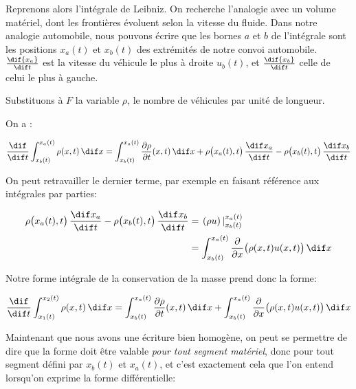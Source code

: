 Reprenons alors l'intégrale de Leibniz.
On recherche l'analogie avec un volume matériel, dont les frontières évoluent selon la vitesse du fluide. Dans notre analogie automobile, nous pouvons écrire que les bornes $a$ et $b$ de l'intégrale sont les positions $x_a(t)$ et $x_b(t)$ des extrémités de notre convoi automobile. 
$\frac{\dif{x_a}}{\dif t}$ est la vitesse du véhicule le plus à droite $u_b(t)$, et 
$\frac{\dif{x_b}}{\dif t}$ celle de celui  le plus à gauche. 

Substituons à $F$ la variable $\rho$, le nombre de véhicules par unité de longueur. 

On a : 

\begin{equation}
\frac{\dif}{\dif t} \int_{x_b(t)}^{x_a(t)} \rho(x,t)\, \dif x
=
\int_{x_b(t)}^{x_a(t)} \frac{\partial \rho}{\partial t}(x,t)\, \dif x
+
\rho\bigl(x_a(t),t\bigr)\,\frac{\dif x_a}{\dif t}
-
\rho\bigl(x_b(t),t\bigr)\,\frac{\dif x_b}{\dif t}
\label{eq:leibniz_rho}
\end{equation}

On peut retravailler le dernier terme, par exemple en faisant référence aux intégrales par parties: 

\begin{equation}
  \begin{split}
\rho\bigl(x_a(t),t\bigr)\,\frac{\dif x_a}{\dif t}
-
\rho\bigl(x_b(t),t\bigr)\,\frac{\dif x_b}{\dif t}
&= 
    \left. (\rho u\right)|_{x_b(t)}^{x_a(t)}\\ &=
    \int_{x_b(t)}^{x_a(t)}\frac{\partial}{\partial x} \bigl(\rho(x,t) u(x,t)\bigr)\,\dif x
\label{eq:leibniz_rho2}
  \end{split}
\end{equation}

Notre forme intégrale de la conservation de la masse prend donc la forme: 

\begin{equation}
\frac{\dif}{\dif t} \int_{x_1(t)}^{x_2(t)} \rho(x,t)\, \dif x
=
\int_{x_b(t)}^{x_a(t)} \frac{\partial \rho}{\partial t}(x,t)\, \dif x
+ \int_{x_b(t)}^{x_a(t)} \frac{\partial}{\partial x} \bigl(\rho(x,t) u(x,t)\bigr)\,\dif x
\label{eq:cons_massineique_integrale}
\end{equation}

Maintenant que nous avons une écriture bien homogène, on peut se permettre de dire que la forme doit être valable \emph{pour tout segment matériel}, donc pour tout segment défini par $x_b(t)$ et $x_a(t)$, et c'est exactement cela que l'on entend lorsqu'on exprime la forme différentielle: 

